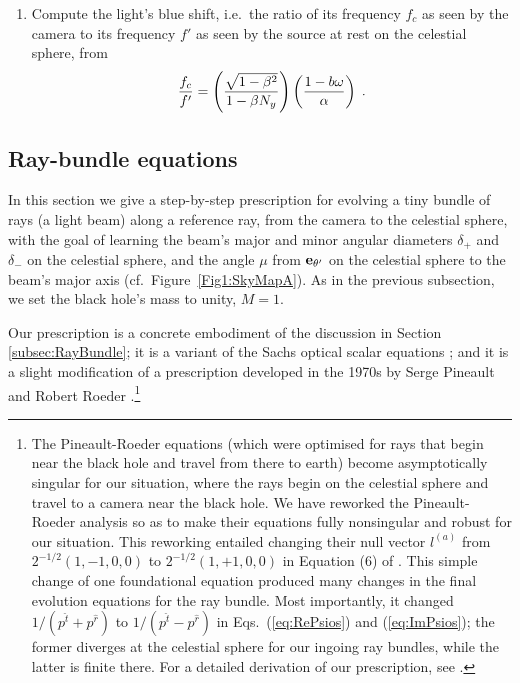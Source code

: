 \documentclass[12pt]{iopart}
\begin{document}
\begin{enumerate}
numerically, backward in time 
from $\zeta= 0$ to $\zeta = \zeta_f$, where $\zeta_f$ is either $-\infty$ or some very negative value.  (This super-Hamiltonian version of the ray equations is 
well behaved and robust at turning points, by contrast, for example, with a
commonly used version of the form $\rho^2 dr/d\zeta = \pm \sqrt{R}$, 
$\rho^2 d\theta/d\zeta=\pm \sqrt{\Theta}$, ... ; Eqs.\ (33.32) of MTW 
\cite{MTW}.) 
The ray's source point 
$(\theta',\phi')$ on the
celestial sphere is $\theta'=\theta(\zeta_f)$, $\phi'=\phi(\zeta_f)$.
\item
Compute the light's blue shift, i.e.\ the ratio of its frequency $f_c$ as seen by the camera to
its frequency $f'$ as seen by the source at rest on the celestial sphere, from  \begin{equation}
{f_c\over f'} 
=
 \left(\frac{\sqrt{1-\beta^2}}{1- \beta N_y }\right)
 \left( {1-b\omega\over\alpha}\right) \;.
 \label{eq:FinalBlueShift}
 \end{equation}
\end{enumerate}



\subsection{Ray-bundle equations}
\label{subsec:App-RayBundle}

In this section we give a step-by-step prescription for evolving a tiny bundle of rays
(a light beam) along a reference ray, from the camera to the celestial sphere, with
the goal of learning the beam's major and minor angular diameters $\delta_+$
and $\delta_-$ on the celestial sphere, and the angle $\mu$ from ${\bf e}_{\theta'}$ on
the celestial sphere to the beam's major axis (cf.\ Figure\ \ref{Fig1:SkyMapA}).  As in the previous subsection, we
set the black hole's mass to unity, $M=1$.

Our prescription is a concrete embodiment of the discussion in Section \ref{subsec:RayBundle}; it is a variant of the Sachs optical scalar equations
\cite{Ehlers};  and it is a slight modification of a prescription developed
in the 1970s by Serge Pineault and Robert Roeder 
\cite{PR1,PR2}.\footnote{The Pineault-Roeder equations
(which were optimised for rays that begin near the black hole and travel from there to earth) become asymptotically singular for our situation, where the rays begin on the celestial sphere and travel to a camera near the black hole.     We have reworked the Pineault-Roeder analysis so as to make their equations fully nonsingular and robust for our situation. This reworking entailed
changing their null vector $l^{(a)}$ from $2^{-1/2}(1,-1,0,0)$ to $2^{-1/2}(1,+1,0,0)$ in
Equation (6) of \cite{PR1}.  This simple change of one foundational equation produced many changes in the final evolution equations for the ray bundle.  Most 
importantly, it changed $1/(p^{\hat t}+p^{\hat r})$ to $1/(p^{\hat t}-p^{\hat r})$ in Eqs.\ (\ref{eq:RePsios}) and (\ref{eq:ImPsios}); 
the former diverges at the celestial sphere for our ingoing ray bundles, while
the latter is finite there.  For a detailed derivation of our prescription, see
\cite{KipMathematica}.}
\end{document}
